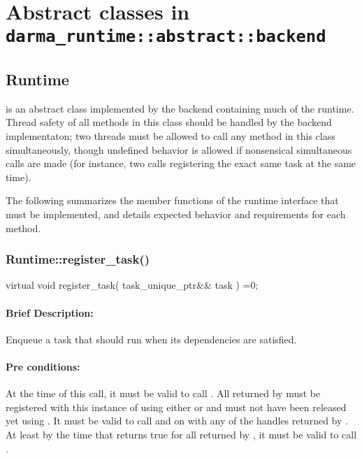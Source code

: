 \section{Abstract classes in {\tt darma\_runtime::abstract::backend}}

\subsection{{Runtime}}
 is an abstract class implemented by the backend containing
much of the runtime.  Thread safety of all methods in this class should be handled by the backend implementaton;
two threads must  be allowed to call any method in this class simultaneously, though undefined behavior
is allowed if nonsensical simultaneous calls are made (for instance, two calls registering the exact same
task at the same time).

The following summarizes the member functions of the runtime interface that
must be implemented, and details expected behavior and requirements for each
method.




\subsubsection{ Runtime::register\_task() }
\begin{CppCode}
virtual void register_task(
      task_unique_ptr&& task
    ) =0;
\end{CppCode}

\paragraph{Brief Description:} Enqueue a task that should run when its
dependencies are satisfied.
     
\paragraph{Pre conditions:} At the time of this call, it must be valid to call
.  All 
       returned by  must be registered
       with this instance of  using either
        or 
         and must not have been released yet using
           .
       It must be valid to call  and
          on  with any of the handles
       returned by .  At least by the time that
          returns
       true for all  returned by
         , it must be valid to call
           .
     
